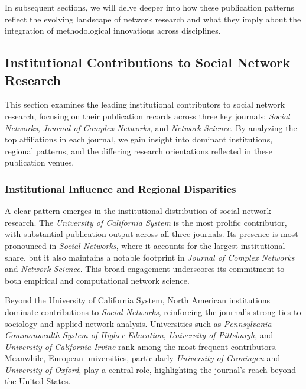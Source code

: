 \documentclass[twocolumn]{article}
\begin{document}
	In subsequent sections, we will delve deeper into how these publication patterns reflect the evolving landscape of network research and what they imply about the integration of methodological innovations across disciplines.
	
	\subsection{Institutional Contributions to Social Network Research}\label{Institutional Contributions to Social Network Research}
	
	This section examines the leading institutional contributors to social network research, focusing on their publication records across three key journals: \textit{Social Networks}, \textit{Journal of Complex Networks}, and \textit{Network Science}. By analyzing the top affiliations in each journal, we gain insight into dominant institutions, regional patterns, and the differing research orientations reflected in these publication venues.
	
	\subsubsection*{Institutional Influence and Regional Disparities}
	
	A clear pattern emerges in the institutional distribution of social network research. The \textit{University of California System} is the most prolific contributor, with substantial publication output across all three journals. Its presence is most pronounced in \textit{Social Networks}, where it accounts for the largest institutional share, but it also maintains a notable footprint in \textit{Journal of Complex Networks} and \textit{Network Science}. This broad engagement underscores its commitment to both empirical and computational network science.
	
	Beyond the University of California System, North American institutions dominate contributions to \textit{Social Networks}, reinforcing the journal’s strong ties to sociology and applied network analysis. Universities such as \textit{Pennsylvania Commonwealth System of Higher Education}, \textit{University of Pittsburgh}, and \textit{University of California Irvine} rank among the most frequent contributors. Meanwhile, European universities, particularly \textit{University of Groningen} and \textit{University of Oxford}, play a central role, highlighting the journal’s reach beyond the United States.
	
\end{document}
